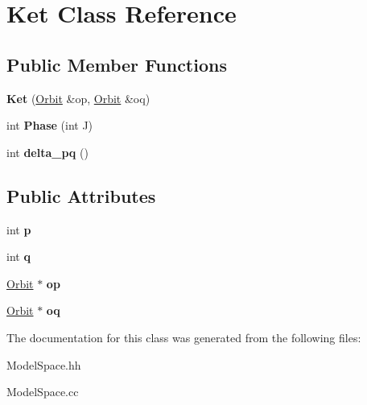 \hypertarget{classKet}{\section{Ket Class Reference}
\label{classKet}
}
\subsection*{Public Member Functions}
\begin{DoxyCompactItemize}
\item 
\hypertarget{classKet_acbf992b0310758f890a6a0ae659c1a46}{{\bfseries Ket} (\hyperlink{structOrbit}{Orbit} \&op, \hyperlink{structOrbit}{Orbit} \&oq)}\label{classKet_acbf992b0310758f890a6a0ae659c1a46}

\item 
\hypertarget{classKet_ac07bfbc7c7f2bdf77341ba6d54036e8e}{int {\bfseries Phase} (int J)}\label{classKet_ac07bfbc7c7f2bdf77341ba6d54036e8e}

\item 
\hypertarget{classKet_ac91fa789aa9e8043da735332b9db3e58}{int {\bfseries delta\-\_\-pq} ()}\label{classKet_ac91fa789aa9e8043da735332b9db3e58}

\end{DoxyCompactItemize}
\subsection*{Public Attributes}
\begin{DoxyCompactItemize}
\item 
\hypertarget{classKet_a3120fbd6d28583a0e06d6426e0e69c83}{int {\bfseries p}}\label{classKet_a3120fbd6d28583a0e06d6426e0e69c83}

\item 
\hypertarget{classKet_afd050bca27dacccd2637266804b4d710}{int {\bfseries q}}\label{classKet_afd050bca27dacccd2637266804b4d710}

\item 
\hypertarget{classKet_a9210bf82629ea07996f3b895bc54ba4d}{\hyperlink{structOrbit}{Orbit} $\ast$ {\bfseries op}}\label{classKet_a9210bf82629ea07996f3b895bc54ba4d}

\item 
\hypertarget{classKet_aa509bf4e812f84bb4c81b00a10d9e82f}{\hyperlink{structOrbit}{Orbit} $\ast$ {\bfseries oq}}\label{classKet_aa509bf4e812f84bb4c81b00a10d9e82f}

\end{DoxyCompactItemize}


The documentation for this class was generated from the following files\-:\begin{DoxyCompactItemize}
\item 
Model\-Space.\-hh\item 
Model\-Space.\-cc\end{DoxyCompactItemize}
